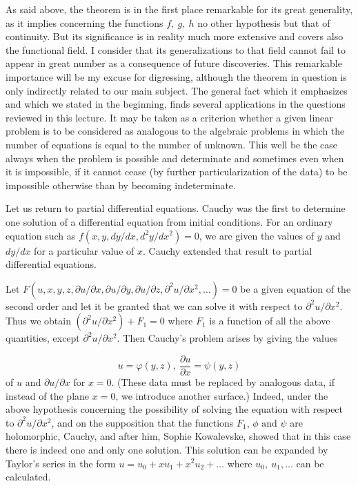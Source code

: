 \documentclass[12pt,oneside]{book}
\begin{document}
As said above, the theorem is in the first place remarkable for its great
generality, as it implies concerning the functions $f,\ g,\ h$ no other
hypothesis but that of continuity. But its significance is in reality much more
extensive and covers also the functional field. I consider that its
generalizations to that field cannot fail to appear in great number as a
consequence of future discoveries. This remarkable importance will be my excuse
for digressing, although the theorem in question is only indirectly related to
our main subject. The general fact which it emphasizes and which we stated in
the beginning, finds several applications in the questions reviewed in this
lecture. It may be taken as a criterion whether a given linear problem is to be
considered as analogous to the algebraic problems in which the number of
equations is equal to the number of unknown. This well be the case always when
the problem is possible and determinate and sometimes even when it is
impossible, if it cannot cease (by further particularization of the data) to be
impossible otherwise than by becoming indeterminate.\label{pg4} \par

Let us return to partial differential equations. Cauchy was the first to
determine one solution of a differential equation from initial conditions. For
an ordinary equation such as $f(x,y,dy/dx,d^2y/dx^2)=0$, we are given the values
of $y$ and $dy/dx$ for a particular value of $x$. Cauchy extended that result to
partial differential equations. \par

Let $F(u,x,y,z,\partial u/\partial x, \partial u/\partial y, \partial u/\partial
z,\partial^2u/\partial x^2,\dots)=0$ be a given equation of the second order and
let it be granted that we can solve it with respect to $\partial^2u/\partial
x^2$. Thus we obtain $(\partial^2u/\partial x^2) + F_1 =0$ where $F_1$ is a
function of all the above quantities, except $\partial^2u/\partial x^2$. Then
Cauchy's problem arises by giving the values

\begin{equation}
    \label{eq3}
    u=\varphi (y,z),\ \frac{\partial u}{\partial x}=\psi(y,z)
\end{equation}
of $u$ and $\partial u/\partial x$ for $x=0$. (These data must be replaced by
analogous data, if instead of the plane $x=0$, we introduce another surface.)
Indeed, under the above hypothesis concerning the possibility of solving the
equation with respect to $\partial^2 u/\partial x^2$, and on the supposition
that the functions $F_1$, $\phi \text{ and } \psi$ are holomorphic, Cauchy, and
after him, Sophie Kowalevske, showed that in this case there is indeed one and
only one solution. This solution can be expanded by Taylor's series in the form
$u=u_0+xu_1+x^2u_2+ \dots$ where $u_0,\ u_1, \dots$ can be calculated. \par
\end{document}

